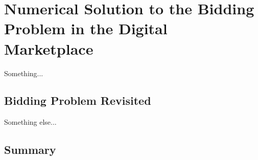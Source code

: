 \chapter{Numerical Solution to the Bidding Problem in the Digital Marketplace}
\label{cha:numerical_solution_to_the_bidding_problem_in_the_digital_marketplace}

\minitoc
\vspace{10mm}

Something...

\section{Bidding Problem Revisited}
\label{sec:bidding_problem_revisited_numerical}
Something else... \cite{Lebrun2006}

\section{Summary}
\label{sec:summary_numerical}

